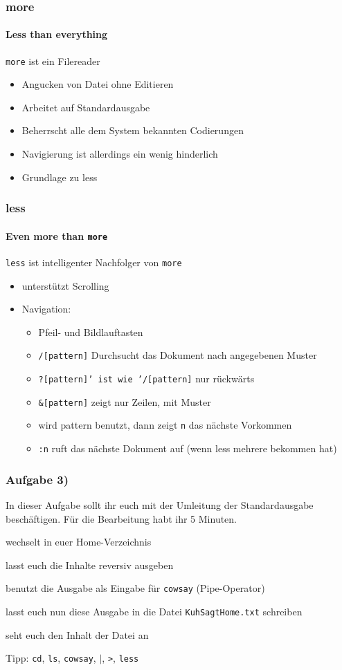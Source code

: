 \documentclass[12pt,utf8]{beamer}
\begin{document}
\begin{frame}
\frametitle{more}
\framesubtitle{\textcolor{ownDarkOr}{Less than everything}}
\texttt{more} ist ein Filereader
\begin{itemize}
	\item Angucken von Datei ohne Editieren
	\item Arbeitet auf Standardausgabe
	\item Beherrscht alle dem System bekannten Codierungen
	\item Navigierung ist allerdings ein wenig hinderlich
	\item Grundlage zu less
\end{itemize}
\end{frame}

\begin{frame}
\frametitle{less}
\framesubtitle{\textcolor{ownDarkOr}{Even more than \texttt{more}}}
\texttt{less} ist intelligenter Nachfolger von \texttt{more}
\begin{itemize}
	\item unterstützt Scrolling
	\item Navigation:
	\begin{itemize}[<+->]
		\item Pfeil- und Bildlauftasten
		\item \texttt{/[pattern]} Durchsucht das Dokument nach angegebenen Muster
		\item \texttt{?[pattern]' ist wie '/[pattern]} nur rückwärts
		\item \texttt{\&[pattern]} zeigt nur Zeilen, mit Muster
		\item wird pattern benutzt, dann zeigt \texttt{n} das nächste Vorkommen
		\item \texttt{:n} ruft das nächste Dokument auf (wenn less mehrere bekommen hat)
	\end{itemize}
\end{itemize}
\end{frame}

\begin{frame}
\frametitle{Aufgabe 3)}
In dieser Aufgabe sollt ihr euch mit der Umleitung der Standardausgabe beschäftigen. Für die Bearbeitung habt ihr 5 Minuten.
\begin{itemize}
	{\footnotesize
	\item wechselt in euer Home-Verzeichnis
	\item lasst euch die Inhalte reversiv ausgeben
	\item benutzt die Ausgabe als Eingabe für \texttt{cowsay} (Pipe-Operator)
	\item lasst euch nun diese Ausgabe in die Datei \texttt{KuhSagtHome.txt} schreiben
	\item seht euch den Inhalt der Datei an
	}
\end{itemize}
{\scriptsize Tipp: \texttt{cd}, \texttt{ls}, \texttt{cowsay}, \texttt{$\mid$}, \texttt{>}, \texttt{less}}
\end{frame}
\end{document}
